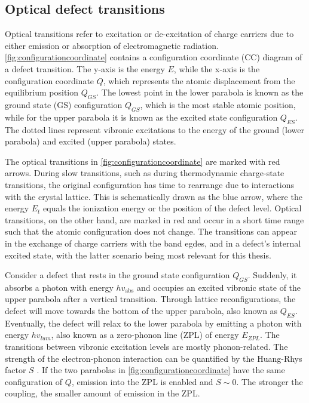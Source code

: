 

\subsection{Optical defect transitions}

Optical transitions refer to excitation or de-excitation of charge carriers due to either emission or absorption of electromagnetic radiation. %
\autoref{fig:configurationcoordinate} contains a configuration coordinate (CC) diagram of a defect transition. The y-axis is the energy $E$, while the x-axis is the configuration coordinate $Q$, which represents the atomic displacement from the equilibrium position $Q_{GS}$. The lowest point in the lower parabola is known as the ground state (GS) configuration $Q_{GS}$, which is the most stable atomic position, while for the upper parabola it is known as the excited state configuration $Q_{ES}$. The dotted lines represent vibronic excitations to the energy of the ground (lower parabola) and excited (upper parabola) states.

The optical transitions in \autoref{fig:configurationcoordinate} are marked with red arrows. During slow transitions, such as during thermodynamic charge-state transitions, the original configuration has time to rearrange due to interactions with the crystal lattice. This is schematically drawn as the blue arrow, where the energy $E_t$ equals the ionization energy or the position of the defect level. Optical transitions, on the other hand, are marked in red and occur in a short time range such that the atomic configuration does not change. The transitions can appear in the exchange of charge carriers with the band egdes, and in a defect's internal excited state, with the latter scenario being most relevant for this thesis.

Consider a defect that rests in the ground state configuration $Q_{GS}$. Suddenly, it absorbs a photon with energy $h v_{\text{abs}}$ and occupies an excited vibronic state of the upper parabola after a vertical transition. Through lattice reconfigurations, the defect will move towards the bottom of the upper parabola, also known as $Q_{ES}$. Eventually, the defect will relax to the lower parabola by emitting a photon with energy $h v_{lum}$, also known as a zero-phonon line (ZPL) of energy $E_{ZPL}$. The transitions between vibronic excitation levels are mostly phonon-related. The strength of the electron-phonon interaction can be quantified by the Huang-Rhys factor $S$ \cite{Huang1950}. If the two parabolas in \autoref{fig:configurationcoordinate} have the same configuration of $Q$, emission into the ZPL is enabled and $S\sim 0$. The stronger the coupling, the smaller amount of emission in the ZPL.

